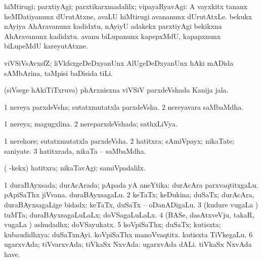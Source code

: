 \bentry
{} 
\gl{\kirxvi}
\expl{\Latin}
\bmng
 hiMtirugi; parxtiyAgi; parxtikarxmadalilx; vipayaRyavAgi:  A vayxkitx tananx heMDatiyanunx dUrutAtxne, avaLU hiMtirugi avananunx dUrutAtxLe.  bekukx nAyiya AhAravanunx kadidxtu, nAyiyU adakekx parxtiyAgi bekikxna AhAravanunx kadidxtu.  avanu biLupanunx kapepxMdU, kapapxnunx biLupeMdU kareyutAtxne. 
\emng
\eentry

\bentry
{} 
\gl{\nA}
\expl{}
\bmng
 viVSiVsAvxsfZ; liVkfsxgeDeDxyanUnx AlUgeDeDxyanUnx hAki mADida sAMbArina, taMpisi baDisida tiLi. 
\emng
\eentry

\bentry
{} 
\gl{\nA}
\expl{}
\bmng
 (siVsege hAkiTiTxruva) phArxnisxna viVSiV parxdeVshada Kanija jala. 
\emng
\eentry

\bentry
{} 
\gl{\nA}
\expl{}
\bmng
\bnum
\num{1} nereya parxdeVsha; sutatxmutatxla parxdeVsha. 
\num{2} nereyavara saMbaMdha. 
\enum
\emng
\eentry

\bentry
{} 
\gl{\gu}
\expl{}
\bmng
\bnum
\num{1} nereya; magugxlina. 
\num{2} nereparxdeVshada; sathxLiVya. 
\enum
\emng
\eentry

\bentry
{} 
\gl{\nA}
\bmng
\bnum
\num{1} nerehore; sutatxmutatxla parxdeVsha. 
\num{2} hatitxra; sAmiVpayx; nikaTate; saniyate. 
\num{3} hatitxrada, nikaTa -- saMbaMdha. 
\enum
\emng

\noindent 
\gl{\pagu}
\expl{}
\bmng
  ( -kekx) hatitxra; nikaTavAgi; samiVpadalilx. 
\emng
\eentry

\bentry 
{} 
\gl{\gu}
\expl{}
\bmng
\bnum
\num{1} duraBAyxsada; durAcArada; pApada yA aneYtika:  durAcAra parxvaqtitxgaLu.  pApiSaThx jiVvana.  duraBAyxsagaLu. 
\num{2} keTaTx; keDukina; duSaTx; durAcAra, duraBAyxsagaLige bidadx:  keTaTx, duSaTx -- oDanADigaLu. 
\num{3} (kudure \mo vugaLa \vi) tuMTa; duraBAyxsagaLuLaLx; doVSagaLuLaLx. 
\num{4} (BASe, dasAtxveVju, takaR, \mo vugaLa \vi) ashudadhx; doVSayukatx. 
\num{5} koVpiSaThx; duSaTx; kutisxta; kubaudidhxya:  duSaTxnAyi.  koVpiSaThx manoVvaqtitx.  kutisxta TiVkegaLu. 
\num{6} ugarxvAda; tiVvarxvAda; tiVkaSx NxvAda:  ugarxvAda dALi.  tiVkaSx NxvAda have. 
\enum
\emng
\eentry

